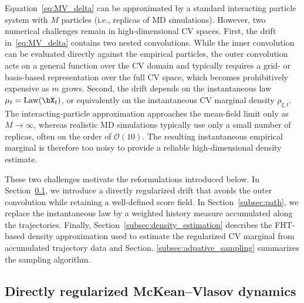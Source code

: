 \documentclass[a4paper,fleqn]{cas-sc}
\theoremstyle{definition}
\begin{document}
Equation~\eqref{eq:MV_delta} can be approximated by a standard interacting particle system with \(M\) particles (i.e., replicas of MD simulations). 
However, two numerical challenges remain in high-dimensional CV spaces. 
First, the drift in~\eqref{eq:MV_delta} contains two nested convolutions. 
While the inner convolution can be evaluated directly against the empirical particles, the outer convolution acts on a general function over the CV domain and typically requires a grid- or basis-based representation over the full CV space, which becomes prohibitively expensive as \(m\) grows. 
Second, the drift depends on the instantaneous law \(\mu_t={\rm Law}(\bX_t)\), or equivalently on the instantaneous CV marginal density \(\rho_{\xi,t}\). 
The interacting-particle approximation approaches the mean-field limit only as \(M\to\infty\), whereas realistic MD simulations typically use only a small number of replicas, often on the order of \(\mathcal O(10)\). 
The resulting instantaneous empirical marginal is therefore too noisy to provide a reliable high-dimensional density estimate.

These two challenges motivate the reformulations introduced below. 
In Section~\ref{subsec:regularized}, we introduce a directly regularized drift that avoids the outer convolution while retaining a well-defined score field. 
In Section~\ref{subsec:path}, we replace the instantaneous law by a weighted history measure accumulated along the trajectories. 
Finally, Section~\ref{subsec:density_estimation} describes the FHT-based density approximation used to estimate the regularized CV marginal from accumulated trajectory data and Section. \ref{subsec:adpative_sampling} summarizes the sampling algorithm. 




\subsection{Directly regularized McKean--Vlasov dynamics}
\label{subsec:regularized}
\end{document}
